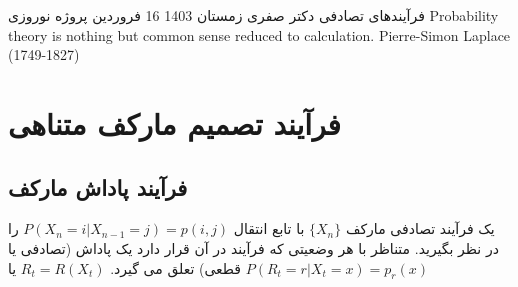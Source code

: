 \documentclass[12pt]{article}
\begin{document}
	\pagestyle{empty}
	\heading
	{
		فرآیندهای تصادفی
	}
	{
		دکتر صفری
	}
	{زمستان 1403}
	{16 فروردین}
	{
		پروژه نوروزی
	}
	\inspiringQuotation
	{Probability theory is nothing but common sense reduced to calculation. }
	{Pierre-Simon Laplace (1749-1827)}
	


    \section{
        فرآیند تصمیم مارکف متناهی
    }   
    \subsection{فرآیند پاداش مارکف}
    یک فرآیند تصادفی مارکف \(\{ X_n \}\) با تابع انتقال \(P(X_n = i | X_{n-1} = j) = p(i,j)\) را در نظر بگیرید. متناظر با هر وضعیتی که فرآیند در آن قرار دارد یک پاداش (تصادفی یا قطعی) تعلق می گیرد.
    \(R_t = R(X_t)\) یا \(P(R_t= r | X_t=x) = p_r(x)\)
\end{document}
